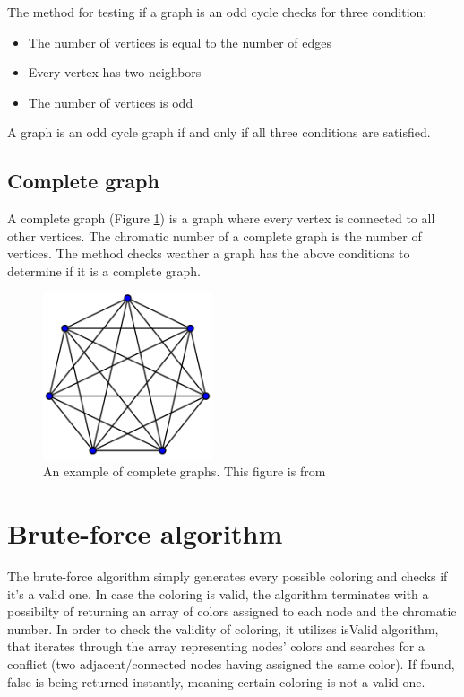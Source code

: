 \documentclass[a4paper]{report}
\begin{document}
			The method for testing if a graph is an odd cycle checks for three condition:
			\begin{itemize}
				\item The number of vertices is equal to the number of edges
				\item Every vertex has two neighbors
				\item The number of vertices is odd
			\end{itemize}
			A graph is an odd cycle graph if and only if all three conditions are satisfied.
			
			\subsection{Complete graph}
			A complete graph (Figure \ref{fig:complete}) is a graph where every vertex is connected to all other vertices. The chromatic number of a complete graph is the number of vertices. The method checks weather a graph has the above conditions to determine if it is a complete graph.
			\begin{figure}[h]
				\centering
				\includegraphics[width=50mm,scale=0.5]{figures/complete.png}
				\caption{An example of complete graphs. This figure is from \protect\cite{completeFig}}
				\label{fig:complete}
			\end{figure}
			
		\section{Brute-force algorithm}
		The brute-force algorithm simply generates every possible coloring and checks if it's a valid one. In case the coloring is valid, the algorithm terminates with a possibilty of returning an array of colors assigned to each node and the chromatic number. In order to check the validity of coloring, it utilizes isValid algorithm, that iterates through the array representing nodes' colors and searches for a conflict (two adjacent/connected nodes having assigned the same color). If found, false is being returned instantly, meaning certain coloring is not a valid one.\\
		
\end{document}

